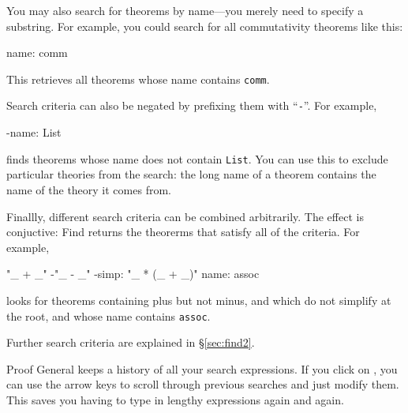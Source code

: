 \begin{isabellebody}
\begin{isamarkuptext}
You may also search for theorems by name---you merely
need to specify a substring. For example, you could search for all
commutativity theorems like this:
\begin{ttbox}
name: comm
\end{ttbox}
This retrieves all theorems whose name contains \texttt{comm}.

Search criteria can also be negated by prefixing them with ``\texttt{-}''.
For example,
\begin{ttbox}
-name: List
\end{ttbox}
finds theorems whose name does not contain \texttt{List}. You can use this
to exclude particular theories from the search: the long name of
a theorem contains the name of the theory it comes from.

Finallly, different search criteria can be combined arbitrarily. 
The effect is conjuctive: Find returns the theorerms that satisfy all of
the criteria. For example,
\begin{ttbox}
"_ + _"  -"_ - _"  -simp: "_ * (_ + _)"  name: assoc
\end{ttbox}
looks for theorems containing plus but not minus, and which do not simplify
\mbox{\isa{{\isacharunderscore}\ {\isacharasterisk}\ {\isacharparenleft}{\isacharunderscore}\ {\isacharplus}\ {\isacharunderscore}{\isacharparenright}}} at the root, and whose name contains \texttt{assoc}.

Further search criteria are explained in \S\ref{sec:find2}.

\begin{pgnote}
Proof General keeps a history of all your search expressions.
If you click on , you can use the arrow keys to scroll
through previous searches and just modify them. This saves you having
to type in lengthy expressions again and again.
\end{pgnote}%
\end{isamarkuptext}%
\isamarkuptrue%
%
\isadelimtheory
%
\endisadelimtheory
%
\isatagtheory
%
\endisatagtheory
{\isafoldtheory}%
%
\isadelimtheory
%
\endisadelimtheory
\end{isabellebody}%
